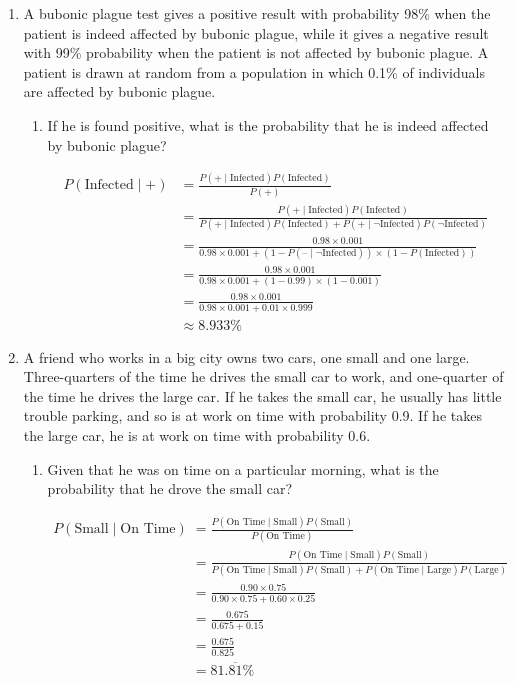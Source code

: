 \documentclass[12pt]{article}
\begin{document}
\begin{enumerate}
\item A bubonic plague test gives a positive result with probability 98\% when the patient is indeed affected by bubonic plague, while it gives a negative result with 99\% probability when the patient is not affected by bubonic plague. A patient is drawn at random from a population in which 0.1\% of individuals are affected by bubonic plague.
  \begin{enumerate}
  \item If he is found positive, what is the probability that he is indeed affected by bubonic plague?

  \begin{align*}
    P(\text{Infected}\mid\text{+}) &= \frac{P(\text{+}\mid\text{Infected}) P(\text{Infected})}{P(\text{+})} \\
    &= \frac{P(\text{+}\mid\text{Infected}) P(\text{Infected})}{P(\text{+}\mid\text{Infected})  P(\text{Infected}) + P(\text{+}\mid\neg\text{Infected}) P(\neg\text{Infected})} \\[8pt]
    &= \frac{0.98 \times 0.001}{0.98 \times 0.001 + (1 - P(\text{--}\mid\neg\text{Infected})) \times (1 - P(\text{Infected}))} \\[8pt]
    &= \frac{0.98 \times 0.001}{0.98 \times 0.001 + (1 - 0.99) \times (1 - 0.001)} \\[8pt]
        &= \frac{0.98 \times 0.001}{0.98 \times 0.001 + 0.01 \times 0.999} \\[8pt]
    &\approx 8.933\%
  \end{align*}

  \end{enumerate}
\newpage

\item A friend who works in a big city owns two cars, one small and one large. Three-quarters of the time he drives the small car to work, and one-quarter of the time he drives the large car. If he takes the small car, he usually has little trouble parking, and so is at work on time with probability 0.9. If he takes the large car, he is at work on time with probability 0.6.
  \begin{enumerate}
  \item Given that he was on time on a particular morning, what is the probability that he drove the small car?

  \begin{align*}
    P(\text{Small}\mid\text{On Time}) &= \frac{P(\text{On Time}\mid\text{Small}) P(\text{Small})}{P(\text{On Time})} \\
    &= \frac{P(\text{On Time}\mid\text{Small}) P(\text{Small})}{P(\text{On Time}\mid\text{Small})  P(\text{Small}) + P(\text{On Time}\mid\text{Large})  P(\text{Large})} \\[8pt]
    &= \frac{0.90 \times 0.75}{0.90 \times 0.75 + 0.60 \times 0.25} \\[8pt]
    &= \frac{0.675}{0.675 + 0.15} \\[8pt]
        &= \frac{0.675}{0.825} \\[8pt]
    &= 81.\overline{81}\%
  \end{align*}


\end{enumerate}
\end{enumerate}
\end{document}
